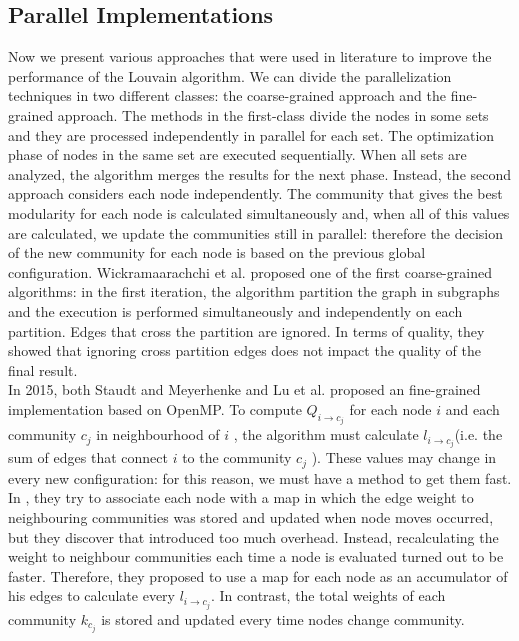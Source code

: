 \subsection{Parallel Implementations}\label{parallel-imp}
Now we present various approaches that were used in literature to improve the performance of the Louvain algorithm. We can divide the parallelization techniques
in two different classes: the coarse-grained approach and the fine-grained approach.
The methods in the first-class divide the nodes in some sets and they
are processed independently in parallel for each set. The optimization phase of nodes in the same set are executed sequentially. When all sets are analyzed,
the algorithm merges the results for the next phase. Instead, the second approach
considers each node independently. The community that gives the best modularity for each node is calculated simultaneously and, when all of this values are calculated, we update the communities still in parallel: therefore the decision of the new community for each node is
based on the previous global configuration. Wickramaarachchi et al. \cite{wickramaarachchi2014fast} proposed one of
the first coarse-grained algorithms: in the first iteration, the algorithm partition the graph
in subgraphs and the execution is performed simultaneously and independently
on each partition. Edges that cross the partition are ignored. In terms of quality,
they showed that ignoring cross partition edges does not impact the quality
of the final result.\\
In 2015, both Staudt and Meyerhenke  \cite{staudt2015engineering} and Lu et al. \cite{lu2015parallel} proposed an fine-grained implementation based on OpenMP. To compute $Q_{i \rightarrow c_j}$ for each node $i$ and each community $c_j$ in neighbourhood of $i$ , the algorithm  must calculate $l_{i\rightarrow c_j}$(i.e. the sum of edges that connect $i$ to the community $c_j$ ). These values may change in every new configuration: for this reason, we must have a method to get them fast. In \cite{staudt2015engineering}, they try to associate each node with a map in which the edge weight to neighbouring communities was stored and updated when node moves occurred, but they discover that introduced too much overhead.
Instead, recalculating the weight to neighbour communities each time a node is evaluated turned out to be faster. Therefore, they proposed to use a map for each node as an accumulator of his edges to calculate every $l_{i\rightarrow c_j}$. In contrast, the total weights of each community $k_{c_j}$ is stored and updated every time nodes change community. 
